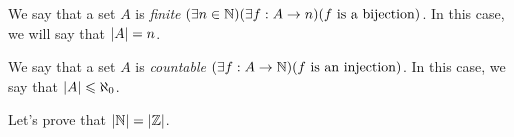 \begin{definition}
    We say that a set $A$ is \emph{finite}
    \iffbydefn $\pn*{\exists n \in \N}\pn*{\exists f: A \to n}\pn*{f \text{ is a bijection}}$.
    In this case, we will say that $\cardinality*{A} = n$.
\end{definition}

\begin{definition}
    We say that a set $A$ is \emph{countable} \iffbydefn
    $\pn*{\exists f: A \to \N}\pn*{f \text{ is an injection}}$.
    In this case, we say that $\cardinality*{A} \leq \aleph_0$.
\end{definition}

\begin{example}
    Let's prove that $\cardinality*{\N} = \cardinality*{\Z}$.
\end{example}
